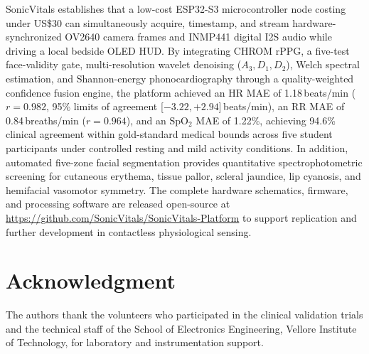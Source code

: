 \documentclass[journal]{IEEEtran}
\begin{document}
SonicVitals establishes that a low-cost ESP32-S3 microcontroller node costing under US\$30 can simultaneously acquire, timestamp, and stream hardware-synchronized OV2640 camera frames and INMP441 digital I2S audio while driving a local bedside OLED HUD. By integrating CHROM rPPG, a five-test face-validity gate, multi-resolution wavelet denoising ($A_3, D_1, D_2$), Welch spectral estimation, and Shannon-energy phonocardiography through a quality-weighted confidence fusion engine, the platform achieved an HR MAE of 1.18\,beats/min ($r=0.982$, 95\% limits of agreement [$-3.22, +2.94$]\,beats/min), an RR MAE of 0.84\,breaths/min ($r=0.964$), and an $\mathrm{SpO_2}$ MAE of 1.22\%, achieving 94.6\% clinical agreement within gold-standard medical bounds across five student participants under controlled resting and mild activity conditions. In addition, automated five-zone facial segmentation provides quantitative spectrophotometric screening for cutaneous erythema, tissue pallor, scleral jaundice, lip cyanosis, and hemifacial vasomotor symmetry. The complete hardware schematics, firmware, and processing software are released open-source at \url{https://github.com/SonicVitals/SonicVitals-Platform} to support replication and further development in contactless physiological sensing.

\section*{Acknowledgment}
The authors thank the volunteers who participated in the clinical validation trials and the technical staff of the School of Electronics Engineering, Vellore Institute of Technology, for laboratory and instrumentation support.



\end{document}
